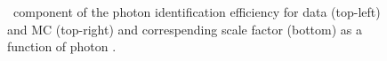 \begin{figure}[htbp]
  \centering
  \caption{
    \egamma\ component of the photon identification efficiency for data (top-left) and MC (top-right) and correspending scale factor (bottom) as a function of photon \pt.
  }
  \label{fig:idsf_results}
\end{figure}

